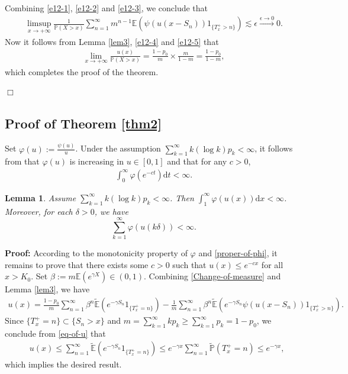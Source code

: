 \documentclass[11pt]{article}
\newtheorem{lemma}[thrm]{Lemma}
\numberwithin{equation}{section}
\begin{document}
Combining \eqref{e12-1}, \eqref{e12-2} and \eqref{e12-3}, we conclude that 
\begin{align}\label{e12-5}
	\limsup_{x\to+\infty} \frac{1}{\mathbb{P}(X>x)} \sum_{n=1}^\infty m^{n-1}\mathbb{E}\left(\psi\left(u(x-S_n)\right)1_{\{T_x^+>n\}}\right) \lesssim \epsilon \stackrel{\epsilon\to 0}{\longrightarrow}0.
\end{align}
Now it follows from Lemma \ref{lem3}, \eqref{e12-4} and \eqref{e12-5} that 
\begin{align}
	\lim_{x\to+\infty} \frac{u(x)}{\mathbb{P}(X>x)} = \frac{1-p_0}{m}\times \frac{m}{1-m}= \frac{1-p_0}{1-m},
\end{align}
which completes the proof of the theorem. 

\hfill$\Box$


\subsection{Proof of Theorem \ref{thm2}}\label{S4.2}

Set $\varphi(u):= \frac{\psi(u)}{u}$. Under the assumption $\sum_{k=1}^\infty k(\log k)p_k<\infty$, it follows from \cite[Lemma 7]{HRSZ25} that $\varphi(u)$ is increasing in $u\in [0,1]$ and  that for any $c>0$,
\begin{align}\label{proper-of-phi}
	\int_0^\infty \varphi (e^{-ct})\mathrm{d} t<\infty .
\end{align}


 
 \begin{lemma}\label{lem4}
 	Assume $\sum_{k=1}^\infty k(\log k) p_k<\infty$. Then $\int_1^\infty \varphi(u(x))\mathrm{d} x<\infty$.  Moreover, for each $\delta>0$, we have
 	\[
 	\sum_{k=1}^\infty \varphi(u(k\delta))<\infty. 
 	\]
 \end{lemma}
 \textbf{Proof:} According to the  monotonicity property of $\varphi$ and \eqref{proper-of-phi}, it remains to prove that there exists some $c>0$ such that $u(x)\leq e^{-cx}$ for all $x>K_0$.
 Set $\beta := m \mathbb{E}(e^{\gamma X})\in (0,1)$.  Combining \eqref{Change-of-measure} and Lemma \ref{lem3}, we have
 \begin{align}\label{eq-of-u}
 	u(x)=\frac{1-p_0}{m}\sum_{n=1}^\infty \beta^{n} \widetilde{\mathbb{E}}\left(e^{-\gamma S_n}1_{\{T_x^+=n\}}\right)-\frac{1}{m}\sum_{n=1}^\infty \beta^{n}\widetilde{\mathbb{E}}\left(e^{-\gamma S_n} \psi\left(u(x-S_n)\right)1_{\{T_x^+>n\}}\right).
 \end{align}
 Since $\{T_x^+=n\} \subset \{S_n>x\}$ and $m=\sum_{k=1}^\infty kp_k \geq \sum_{k=1}^\infty p_k =1-p_0$, we conclude from \eqref{eq-of-u} that 
  \begin{align} 
  	& u(x) \leq  \sum_{n=1}^\infty  \widetilde{\mathbb{E}}\left(e^{-\gamma S_n}1_{\{T_x^+=n\}}\right) \leq  e^{-\gamma x}\sum_{n=1}^\infty   \widetilde{\mathbb{P}}\left( T_x^+=n \right) \leq e^{-\gamma x},
  \end{align}
 which implies the desired result. 
 
\end{document}
